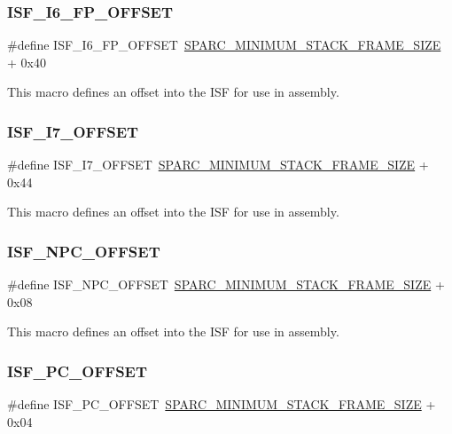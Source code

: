 \subsubsection{\texorpdfstring{ISF\_I6\_FP\_OFFSET}{ISF\_I6\_FP\_OFFSET}}
{\footnotesize\ttfamily \#define I\+S\+F\+\_\+\+I6\+\_\+\+F\+P\+\_\+\+O\+F\+F\+S\+ET~\mbox{\hyperlink{group__RTEMSScoreCPUSPARC_ga8e296685f05588131b26bdc695cb9b8c}{S\+P\+A\+R\+C\+\_\+\+M\+I\+N\+I\+M\+U\+M\+\_\+\+S\+T\+A\+C\+K\+\_\+\+F\+R\+A\+M\+E\+\_\+\+S\+I\+ZE}} + 0x40}

This macro defines an offset into the I\+SF for use in assembly. \mbox{\label{group__RTEMSScoreCPUSPARC_ga942f71395a11bbaa70b3dd49e4d30c40}} 
\subsubsection{\texorpdfstring{ISF\_I7\_OFFSET}{ISF\_I7\_OFFSET}}
{\footnotesize\ttfamily \#define I\+S\+F\+\_\+\+I7\+\_\+\+O\+F\+F\+S\+ET~\mbox{\hyperlink{group__RTEMSScoreCPUSPARC_ga8e296685f05588131b26bdc695cb9b8c}{S\+P\+A\+R\+C\+\_\+\+M\+I\+N\+I\+M\+U\+M\+\_\+\+S\+T\+A\+C\+K\+\_\+\+F\+R\+A\+M\+E\+\_\+\+S\+I\+ZE}} + 0x44}

This macro defines an offset into the I\+SF for use in assembly. \mbox{\label{group__RTEMSScoreCPUSPARC_gaa85e154baea37f924c40a562ceec4017}} 
\subsubsection{\texorpdfstring{ISF\_NPC\_OFFSET}{ISF\_NPC\_OFFSET}}
{\footnotesize\ttfamily \#define I\+S\+F\+\_\+\+N\+P\+C\+\_\+\+O\+F\+F\+S\+ET~\mbox{\hyperlink{group__RTEMSScoreCPUSPARC_ga8e296685f05588131b26bdc695cb9b8c}{S\+P\+A\+R\+C\+\_\+\+M\+I\+N\+I\+M\+U\+M\+\_\+\+S\+T\+A\+C\+K\+\_\+\+F\+R\+A\+M\+E\+\_\+\+S\+I\+ZE}} + 0x08}

This macro defines an offset into the I\+SF for use in assembly. \mbox{\label{group__RTEMSScoreCPUSPARC_ga9a0a516f04675fb88825c67850a91df5}} 
\subsubsection{\texorpdfstring{ISF\_PC\_OFFSET}{ISF\_PC\_OFFSET}}
{\footnotesize\ttfamily \#define I\+S\+F\+\_\+\+P\+C\+\_\+\+O\+F\+F\+S\+ET~\mbox{\hyperlink{group__RTEMSScoreCPUSPARC_ga8e296685f05588131b26bdc695cb9b8c}{S\+P\+A\+R\+C\+\_\+\+M\+I\+N\+I\+M\+U\+M\+\_\+\+S\+T\+A\+C\+K\+\_\+\+F\+R\+A\+M\+E\+\_\+\+S\+I\+ZE}} + 0x04}

